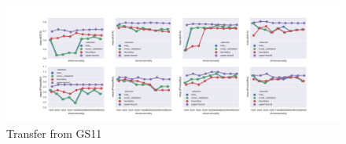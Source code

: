 \begin{figure}
  \centering
    \includegraphics[width=\textwidth]{supplement/figures/GS11-transfer}
    \caption{Transfer from GS11}
    \label{fig:gs11-transfer}
\end{figure}

